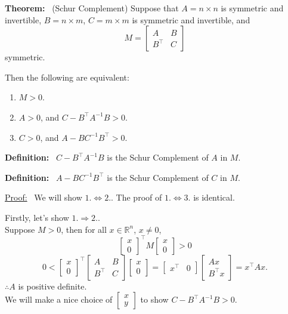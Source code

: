\documentclass[letterpaper]{article}
\begin{document}
\noindent \textbf{Theorem:}~ (Schur Complement) Suppose that $A=n \times n$ is symmetric and invertible, $B=n \times m$,
	$C=m \times m$ is symmetric and invertible, and
	$$M = \left[ \begin{array}{cc} A & B \\	B^\top & C \end{array} \right]$$
	symmetric.

	Then the following are equivalent:
	\begin{enumerate}
		\item $M>0$.
		\item $A>0$, and $C-B^\top A^{-1} B > 0$.
		\item $C>0$, and $A - B C ^{-1} B^\top >0$.
	\end{enumerate}
		
\noindent	\textbf{Definition:}~ $C-B^\top A^{-1}B$ is the Schur Complement of $A$ in $M$.

\noindent	\textbf{Definition:}~ $A-B C^{-1} B^\top$ is the Schur Complement of $C$ in $M$.
		
\noindent \underline{Proof:}~
	We will show $1. \Leftrightarrow 2.$. The proof of $1. \Leftrightarrow 3.$ is identical.

	Firstly, let's show $1. \Rightarrow 2.$.\\
    Suppose $M>0$, then for all $x \in \mathbb{R}^n$, $x\neq 0$,
		$$ \begin{bmatrix}  x \\ 0  \end{bmatrix} ^\top 	M  \begin{bmatrix}  x \\ 0  \end{bmatrix} > 0 $$
		$$ 0 < \begin{bmatrix}  x \\ 0 \end{bmatrix} ^\top \begin{bmatrix} A & B \\	B^\top & C	\end{bmatrix}
		    \begin{bmatrix}  x \\ 0 \end{bmatrix} = \begin{bmatrix} x^\top & 0 \end{bmatrix}
	        \begin{bmatrix}  Ax \\ B^\top x \end{bmatrix} = x^\top A x.$$
		$ \therefore A$ is positive definite.\\
        We will make a nice choice of $ \begin{bmatrix} x \\y \end{bmatrix}$ to show $C-B^\top A^{-1} B > 0$.
\end{document}
